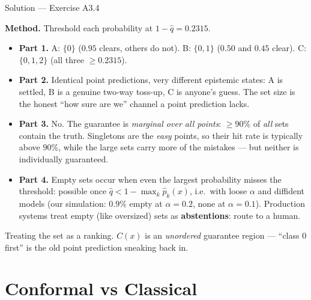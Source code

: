 \documentclass[aspectratio=169,11pt]{beamer}
\begin{document}
\begin{frame}{Solution --- Exercise A3.4}
\begin{solutionbox}
  \scriptsize
  \textbf{Method.} Threshold each probability at $1 - \hat q = 0.2315$.
  \begin{itemize}
    \item \textbf{Part 1.} A: $\{0\}$ ($0.95$ clears, others do not). B: $\{0, 1\}$
          ($0.50$ and $0.45$ clear). C: $\{0, 1, 2\}$ (all three $\ge 0.2315$).
    \item \textbf{Part 2.} Identical point predictions, very different epistemic
          states: A is settled, B is a genuine two-way toss-up, C is anyone's guess.
          The set size is the honest ``how sure are we'' channel a point prediction
          lacks.
    \item \textbf{Part 3.} No. The guarantee is \emph{marginal over all points}:
          $\ge 90\%$ of \emph{all} sets contain the truth. Singletons are the
          \emph{easy} points, so their hit rate is typically above $90\%$, while the
          large sets carry more of the mistakes --- but neither is individually
          guaranteed.
    \item \textbf{Part 4.} Empty sets occur when even the largest probability misses
          the threshold: possible once $\hat q < 1 - \max_k \hat p_k(x)$, i.e.\ with
          loose $\alpha$ and diffident models (our simulation: $0.9\%$ empty at
          $\alpha = 0.2$, none at $\alpha = 0.1$). Production systems treat empty
          (like oversized) sets as \textbf{abstentions}: route to a human.
  \end{itemize}
\end{solutionbox}
\begin{mistake}
  Treating the set as a ranking. $C(x)$ is an \emph{unordered} guarantee region ---
  ``class 0 first'' is the old point prediction sneaking back in.
\end{mistake}
\end{frame}

\section{Conformal vs Classical}
\end{document}
